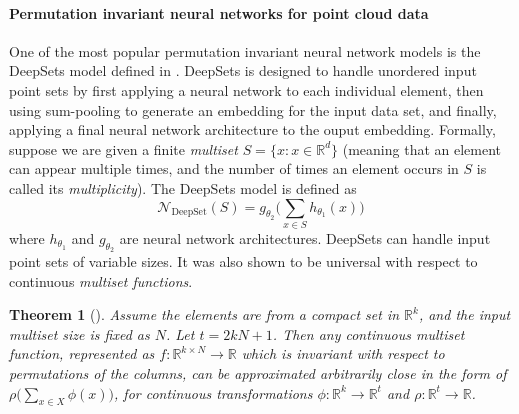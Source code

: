 \documentclass[12pt]{article}
\newcommand{\R}{\mathbb R}
\newtheorem{theorem}{Theorem}[section]
\begin{document}
\paragraph{Permutation invariant neural networks for point cloud data}
\label{subsec:point-cloud-invariance}
One of the most popular permutation invariant neural network models is the DeepSets model defined in \citep{zaheer2017deep}. 
DeepSets is designed to handle unordered input point sets by first applying a neural network to each individual element, then using sum-pooling to generate an embedding for the input data set, and finally, applying a final neural network architecture to the ouput embedding. 
Formally, suppose we are given a finite \emph{multiset} $S = \{x : x\in \R^d\}$ (meaning that an element can appear multiple times, and the number of times an element occurs in $S$ is called its \emph{multiplicity}). 
The DeepSets model is defined as 
\begin{equation*}
    \mathcal{N}_{\mathrm{DeepSet}}(S) = g_{\theta_2} \Big(\sum_{x \in S} h_{\theta_1}(x)\Big)
\end{equation*}
where $h_{\theta_1}$ and $g_{\theta_2}$ are neural network architectures. %
DeepSets can handle input point sets of variable sizes. 
It was also shown to be universal with respect to continuous \emph{multiset functions}. 
\begin{theorem}[\citep{zaheer2017deep, amir2023neural, dym2022low}]
\label{thm:sum-decomposition}
    Assume the elements are from a compact set in $\R^k$, 
    and the input multiset size is fixed as $N$. Let $t=2kN + 1$. Then any continuous multiset function, represented as $f: \R^{k \times N} \to \R$ which is invariant with respect to permutations of the columns, can be approximated arbitrarily close in the form of $\rho \Big(\sum_{x \in X} \phi(x) \Big)$, for continuous transformations $\phi:\R^k \to \R^{t}$ and $\rho: \R^t \to \R$.

\end{theorem}
\end{document}
